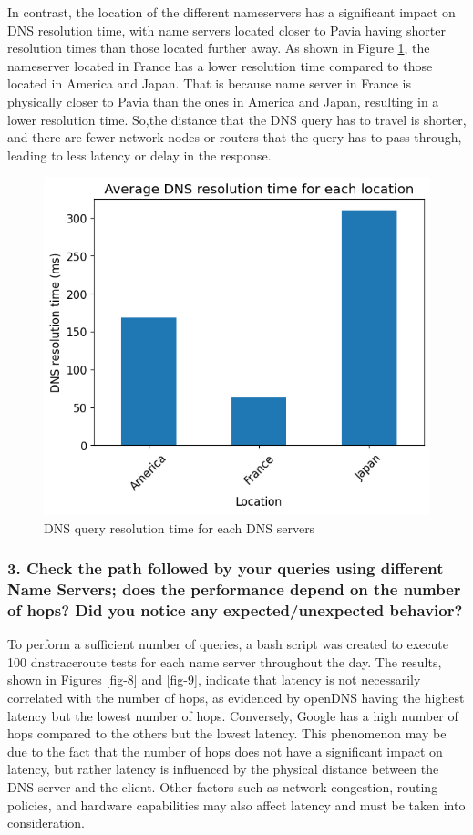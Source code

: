 \documentclass[eng]{class}
\begin{document}
In contrast, the location of the different nameservers has a significant impact on DNS resolution time,
with name servers located closer to Pavia having shorter resolution times than those located further away.\newline
As shown in Figure \ref{fig-7}, the nameserver located in France has a lower resolution time compared to those located in America and Japan.
That is because name server in France is physically closer to Pavia than the ones in America and Japan, resulting in a lower resolution time.
So,the distance that the DNS query has to travel is shorter, and there are fewer network nodes or routers that the query has to pass through, leading to less latency or delay in the response.
\begin{figure}[H]
  \centering
  \includegraphics[width=.7\columnwidth]{images/avgLat2.2.loc.png}
  \caption{DNS query resolution time for each DNS servers}
  \label{fig-7}
\end{figure}
\subsubsection*{3. Check the path followed by your queries using different Name Servers; does the
  performance depend on the number of hops? Did you notice any
  expected/unexpected behavior?}

To perform a sufficient number of queries, a bash script was created to execute 100 dnstraceroute tests for each name server throughout the day.\newline
The results, shown in Figures \ref{fig-8} and \ref{fig-9}, indicate that latency is not necessarily correlated with the number of hops,
as evidenced by openDNS having the highest latency but the lowest number of hops.
Conversely, Google has a high number of hops compared to the others but the lowest latency.
This phenomenon may be due to the fact that the number of hops does not have a significant impact on latency,
but rather latency is influenced by the physical distance between the DNS server and the client.
Other factors such as network congestion, routing policies, and hardware capabilities may also affect latency and must be taken into consideration.
\end{document}
